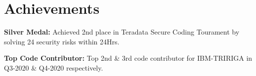 \documentclass[]{deedy-resume-openfont}
\newcommand{\ExternalLink}{%
    \tikz[x=1.2ex, y=1.2ex, baseline=-0.05ex]{%
        \begin{scope}[x=1ex, y=1ex]
            \clip (-0.1,-0.1) 
                --++ (-0, 1.2) 
                --++ (0.6, 0) 
                --++ (0, -0.6) 
                --++ (0.6, 0) 
                --++ (0, -1);
            \path[draw, 
                line width = 0.7, 
                rounded corners=0.7] 
                (0,0) rectangle (1,1);
        \end{scope}
        \path[draw, line width = 0.7] (0.5, 0.5) 
            -- (1, 1);
        \path[draw, line width = 0.7] (0.6, 1) 
            -- (1, 1) -- (1, 0.6);
        }
    }
\begin{document}

\section{Achievements}
\vspace{\topsep}
\begin{tightemize}
\item \textcolor{subheadings}{{\bf Silver Medal:} Achieved 2nd place in Teradata Secure Coding Tourament by solving 24 security risks within 24Hrs.}
\item \textcolor{subheadings}{{\bf Top Code Contributor:} Top 2nd \& 3rd code contributor for IBM-TRIRIGA in Q3-2020 \& Q4-2020 respectively.}
\end{tightemize}
\sectionsep




\end{document}
